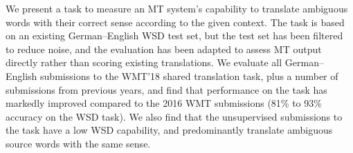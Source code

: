 We present a task to measure an MT system's capability to translate ambiguous words with their correct sense according to the given context. The task is based on an existing German--English WSD test set, but the test set has been filtered to reduce noise, and the evaluation has been adapted to assess MT output directly rather than scoring existing translations. We evaluate all German--English submissions to the WMT'18 shared translation task, plus a number of submissions from previous years, and find that performance on the task has markedly improved compared to the 2016 WMT submissions (81\% to 93\% accuracy on the WSD task). We also find that the unsupervised submissions to the task have a low WSD capability, and predominantly translate ambiguous source words with the same sense.
